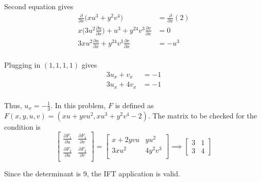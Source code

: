 Second equation gives 
\begin{align*}
    \frac{\partial }{\partial x}\Big(xu^3+y^2v^4\Big)&=\frac{\partial}{\partial x}(2)\\
    x\Big(3u^2\frac{\partial u}{\partial x}\Big)+u^3+y^24v^3\frac{\partial v}{\partial x}&=0\\
    3xu^2\frac{\partial u}{\partial x}+y^24v^3\frac{\partial v}{\partial x}&=-u^3\\
\end{align*}

Plugging in $(1,1,1,1)$ gives 
\begin{align*}
    3u_x+v_x&=-1\\
    3u_x+4v_x&=-1\\
\end{align*}

Thus, $u_x=-\frac{1}{3}$. In this problem, $F$ is defined as $F(x,y,u,v)=(xu+yvu^2,xu^3+y^2v^4-2)$.
The matrix to be checked for the condition is 
\[
    \begin{bmatrix}
    \frac{\partial F_1}{\partial u}&\frac{\partial F_1}{\partial v}\\
    \frac{\partial F_2}{\partial u}&\frac{\partial F_2}{\partial v}\\
    \end{bmatrix}
    =
    \begin{bmatrix}
    x+2yvu&yu^2\\
    3xu^2&4y^2v^3\\
    \end{bmatrix}
    \implies 
    \begin{bmatrix}
        3&1\\
        3&4
    \end{bmatrix}
\]

Since the determinant is 9, the IFT application is valid.